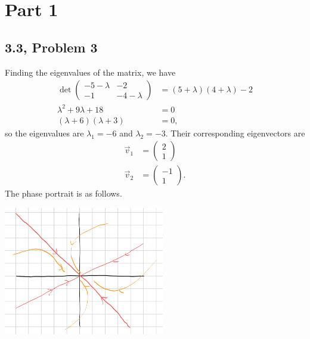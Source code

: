 \documentclass[10pt]{mypackage}
\begin{document}
\RaggedRight
\section{Part 1}%
\subsection{3.3, Problem 3}%
Finding the eigenvalues of the matrix, we have
\begin{align*}
  \det \begin{pmatrix}-5-\lambda & -2 \\ -1 & -4-\lambda\end{pmatrix} &= \left(5+\lambda\right)\left(4 + \lambda\right) -2\\
  \lambda^2 + 9\lambda +18 &= 0\\
  \left(\lambda + 6\right)\left(\lambda + 3\right) &= 0,
\end{align*}
so the eigenvalues are $\lambda_1 = -6$ and $\lambda_2 = -3$. Their corresponding eigenvectors are
\begin{align*}
  \vec{v}_1 &= \begin{pmatrix}2\\1\end{pmatrix}\\
  \vec{v}_2 &= \begin{pmatrix}-1\\1\end{pmatrix}.
\end{align*}
The phase portrait is as follows.
\begin{center}
  \includegraphics[width=7cm]{images/3_3_3.png}
\end{center}
\end{document}
